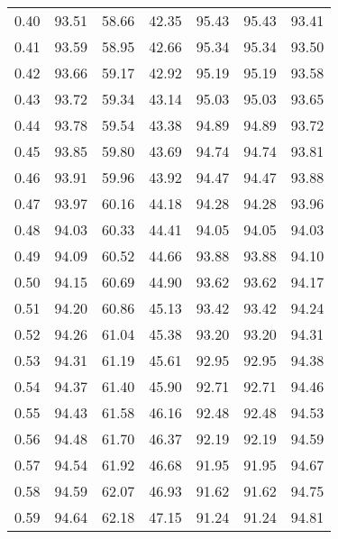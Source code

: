 \begin{tabular}{|c|c|c|c|c|c|c|}
      0.40 &     93.51 &     58.66 &      42.35 &   95.43 &      95.43 &         93.41 \\
      0.41 &     93.59 &     58.95 &      42.66 &   95.34 &      95.34 &         93.50 \\
      0.42 &     93.66 &     59.17 &      42.92 &   95.19 &      95.19 &         93.58 \\
      0.43 &     93.72 &     59.34 &      43.14 &   95.03 &      95.03 &         93.65 \\
      0.44 &     93.78 &     59.54 &      43.38 &   94.89 &      94.89 &         93.72 \\
      0.45 &     93.85 &     59.80 &      43.69 &   94.74 &      94.74 &         93.81 \\
      0.46 &     93.91 &     59.96 &      43.92 &   94.47 &      94.47 &         93.88 \\
      0.47 &     93.97 &     60.16 &      44.18 &   94.28 &      94.28 &         93.96 \\
      0.48 &     94.03 &     60.33 &      44.41 &   94.05 &      94.05 &         94.03 \\
      0.49 &     94.09 &     60.52 &      44.66 &   93.88 &      93.88 &         94.10 \\
      0.50 &     94.15 &     60.69 &      44.90 &   93.62 &      93.62 &         94.17 \\
      0.51 &     94.20 &     60.86 &      45.13 &   93.42 &      93.42 &         94.24 \\
      0.52 &     94.26 &     61.04 &      45.38 &   93.20 &      93.20 &         94.31 \\
      0.53 &     94.31 &     61.19 &      45.61 &   92.95 &      92.95 &         94.38 \\
      0.54 &     94.37 &     61.40 &      45.90 &   92.71 &      92.71 &         94.46 \\
      0.55 &     94.43 &     61.58 &      46.16 &   92.48 &      92.48 &         94.53 \\
      0.56 &     94.48 &     61.70 &      46.37 &   92.19 &      92.19 &         94.59 \\
      0.57 &     94.54 &     61.92 &      46.68 &   91.95 &      91.95 &         94.67 \\
      0.58 &     94.59 &     62.07 &      46.93 &   91.62 &      91.62 &         94.75 \\
      0.59 &     94.64 &     62.18 &      47.15 &   91.24 &      91.24 &         94.81 \\

\end{tabular}
